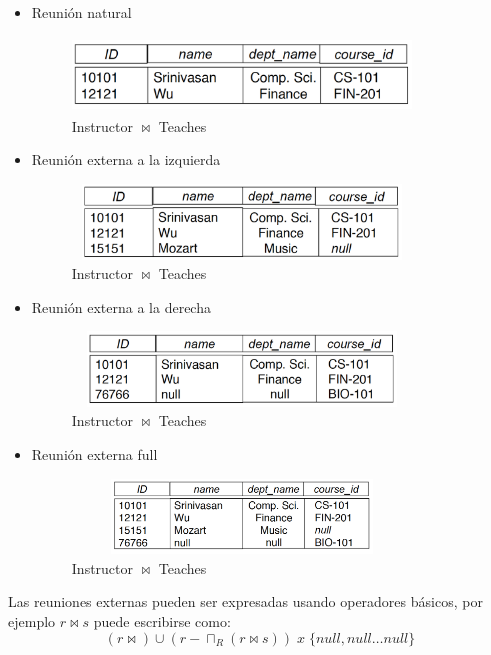 \documentclass[12pt,a4paper]{report}
\begin{document}
		\begin{itemize}
			\item Reunión natural
			\begin{figure}[htb]
				\centering
				\includegraphics[width=9cm, height=2cm]{./imagenes/nj.png}
				\caption{Instructor $\bowtie$ Teaches}
			\end{figure}
			\item Reunión externa a la izquierda
			\begin{figure}[htb]
				\centering
				\includegraphics[width=9cm, height=2cm]{./imagenes/izquierda.png}
				\caption{Instructor $\bowtie$ Teaches}
			\end{figure}
			\item Reunión externa a la derecha
			\begin{figure}[htb]
				\centering
				\includegraphics[width=9cm, height=2cm]{./imagenes/derecha.png}
				\caption{Instructor $\bowtie$ Teaches}
			\end{figure}
			\item Reunión externa full
			\begin{figure}[htb]
				\centering
				\includegraphics[width=9cm, height=2cm]{./imagenes/full.png}
				\caption{Instructor $\bowtie$ Teaches}
			\end{figure}
		\end{itemize}
		
		\par Las reuniones externas pueden ser expresadas usando operadores básicos, por ejemplo $r \bowtie s$ puede escribirse como:
		\[ (r \bowtie) \cup (r - \sqcap_{R}(r \bowtie s)) \; x \; \lbrace null, null \dotsc null 	 \rbrace\]
	
\end{document}
